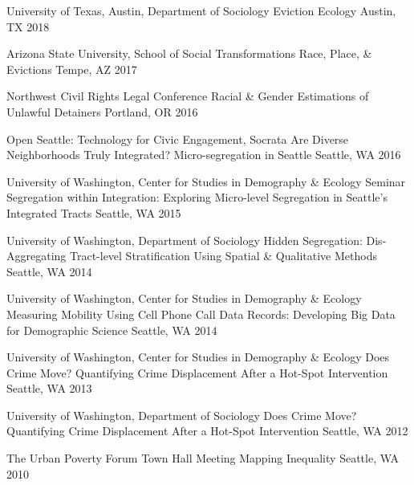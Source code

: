 \begin{cventries}
  \cventry
    {University of Texas, Austin, Department of Sociology} %
    {Eviction Ecology} %
    {Austin, TX} %
    {2018} %
    {}

  \cventry
    {Arizona State University, School of Social Transformations} %
    {Race, Place, \& Evictions} %
    {Tempe, AZ} %
    {2017} %
    {}

  \cventry
    {Northwest Civil Rights Legal Conference} %
    {Racial \& Gender Estimations of Unlawful Detainers} %
    {Portland, OR} %
    {2016} %
    {}
    
  \cventry
    {Open Seattle: Technology for Civic Engagement, Socrata} %
    {Are Diverse Neighborhoods Truly Integrated? Micro-segregation in Seattle} %
    {Seattle, WA} %
    {2016} %
    {}
    
  \cventry
    {University of Washington, Center for Studies in Demography \& Ecology Seminar} %
    {Segregation within Integration: Exploring Micro-level Segregation in Seattle's Integrated Tracts} %
    {Seattle, WA} %
    {2015} %
    {}
    
  \cventry
    {University of Washington, Department of Sociology} %
    {Hidden Segregation: Dis-Aggregating Tract-level Stratification Using Spatial \& Qualitative Methods} %
    {Seattle, WA} %
    {2014} %
    {}
    
  \cventry
    {University of Washington, Center for Studies in Demography \& Ecology} %
    {Measuring Mobility Using Cell Phone Call Data Records: Developing Big Data for Demographic Science} %
    {Seattle, WA} %
    {2014} %
    {}
    
  \cventry
    {University of Washington, Center for Studies in Demography \& Ecology} %
    {Does Crime Move? Quantifying Crime Displacement After a Hot-Spot Intervention} %
    {Seattle, WA} %
    {2013} %
    {}
    
  \cventry
    {University of Washington, Department of Sociology} %
    {Does Crime Move? Quantifying Crime Displacement After a Hot-Spot Intervention} %
    {Seattle, WA} %
    {2012} %
    {}
    
  \cventry
    {The Urban Poverty Forum Town Hall Meeting} %
    {Mapping Inequality} %
    {Seattle, WA} %
    {2010} %
    {}


\end{cventries}

